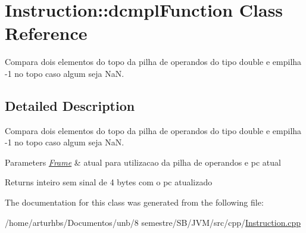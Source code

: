 \hypertarget{classInstruction_1_1dcmplFunction}{}\section{Instruction\+:\+:dcmpl\+Function Class Reference}
\label{classInstruction_1_1dcmplFunction}


Compara dois elementos do topo da pilha de operandos do tipo double e empilha -\/1 no topo caso algum seja NaN.  




\subsection{Detailed Description}
Compara dois elementos do topo da pilha de operandos do tipo double e empilha -\/1 no topo caso algum seja NaN. 


\begin{DoxyParams}{Parameters}
{\em \hyperlink{classFrame}{Frame}} & atual para utilizacao da pilha de operandos e pc atual \\
\hline
\end{DoxyParams}
\begin{DoxyReturn}{Returns}
inteiro sem sinal de 4 bytes com o pc atualizado 
\end{DoxyReturn}


The documentation for this class was generated from the following file\+:\begin{DoxyCompactItemize}
\item 
/home/arturhbs/\+Documentos/unb/8 semestre/\+S\+B/\+J\+V\+M/src/cpp/\hyperlink{Instruction_8cpp}{Instruction.\+cpp}\end{DoxyCompactItemize}
